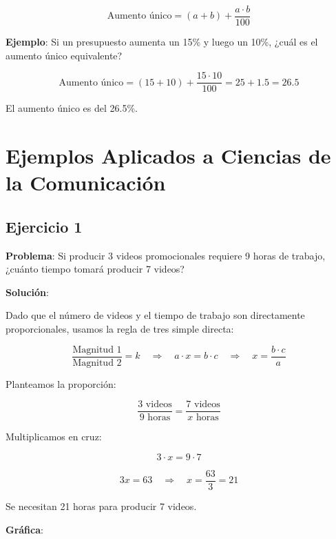 \documentclass[
  stu,
  floatsintext,
  longtable,
  a4paper,
  nolmodern,
  notxfonts,
  notimes,
  12pt,
  colorlinks=true,linkcolor=blue,citecolor=blue,urlcolor=blue]{apa7}
\begin{document}
\[
\text{Aumento único} = (a + b) + \frac{a \cdot b}{100}
\]

\textbf{Ejemplo}: Si un presupuesto aumenta un 15\% y luego un 10\%,
¿cuál es el aumento único equivalente?

\[
\text{Aumento único} = (15 + 10) + \frac{15 \cdot 10}{100} = 25 + 1.5 = 26.5
\]

El aumento único es del 26.5\%.

\section{Ejemplos Aplicados a Ciencias de la
Comunicación}\label{ejemplos-aplicados-a-ciencias-de-la-comunicaciuxf3n}

\subsection{Ejercicio 1}\label{ejercicio-1}

\textbf{Problema}: Si producir 3 videos promocionales requiere 9 horas
de trabajo, ¿cuánto tiempo tomará producir 7 videos?

\textbf{Solución}:

Dado que el número de videos y el tiempo de trabajo son directamente
proporcionales, usamos la regla de tres simple directa:

\[
\frac{\text{Magnitud 1}}{\text{Magnitud 2}} = k \quad \Rightarrow \quad a \cdot x = b \cdot c \quad \Rightarrow \quad x = \frac{b \cdot c}{a}
\]

Planteamos la proporción:

\[
\frac{3 \text{ videos}}{9 \text{ horas}} = \frac{7 \text{ videos}}{x \text{ horas}}
\]

Multiplicamos en cruz:

\[
3 \cdot x = 9 \cdot 7
\]

\[
3x = 63 \quad \Rightarrow \quad x = \frac{63}{3} = 21
\]

Se necesitan 21 horas para producir 7 videos.

\textbf{Gráfica}:
\end{document}
